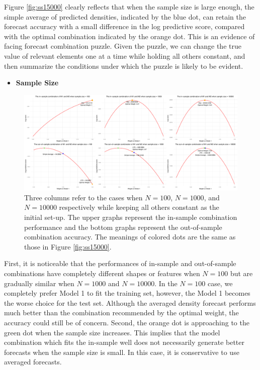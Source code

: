 \documentclass{monashthesis}
\begin{document}
Figure \ref{fig:ss15000} clearly reflects that when the sample size is large enough, the simple average of predicted densities, indicated by the blue dot, can retain the forecast accuracy with a small difference in the log predictive score, compared with the optimal combination indicated by the orange dot. This is an evidence of facing forecast combination puzzle. Given the puzzle, we can change the true value of relevant elements one at a time while holding all others constant, and then summarize the conditions under which the puzzle is likely to be evident.

\begin{itemize}
\tightlist
\item
  \bf{Sample Size}
\end{itemize}

\begin{figure}[ht]
\centering
\includegraphics[scale=0.35]{figures/Sample_Size_100-10000.png}
\caption{Three columns refer to the cases when $N=100$, $N=1000$, and $N=10000$ respectively while keeping all others constant as the initial set-up. The upper graphs represent the in-sample combination performance and the bottom graphs represent the out-of-sample combination accuracy. The meanings of colored dots are the same as those in Figure \ref{fig:ss15000}.}
\label{fig:ss}
\end{figure}

First, it is noticeable that the performances of in-sample and out-of-sample combinations have completely different shapes or features when \(N=100\) but are gradually similar when \(N=1000\) and \(N=10000\). In the \(N=100\) case, we completely prefer Model 1 to fit the training set, however, the Model 1 becomes the worse choice for the test set. Although the averaged density forecast performs much better than the combination recommended by the optimal weight, the accuracy could still be of concern. Second, the orange dot is approaching to the green dot when the sample size increases. This implies that the model combination which fits the in-sample well does not necessarily generate better forecasts when the sample size is small. In this case, it is conservative to use averaged forecasts.
\end{document}
